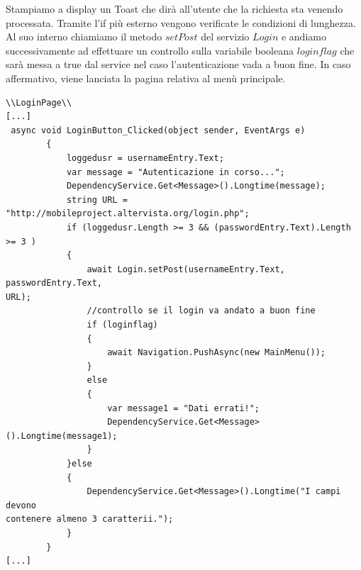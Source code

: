\documentclass[a4paper, 50pt, twoside]{article}
\begin{document}
Stampiamo a display un Toast che dirà all'utente che la richiesta sta venendo processata. Tramite l'if più esterno vengono verificate le condizioni di lunghezza. Al suo interno chiamiamo il metodo $setPost$ del servizio $Login$ e andiamo successivamente ad effettuare un controllo sulla variabile booleana $loginflag$ che sarà messa a true dal service nel caso l'autenticazione vada a buon fine. In caso affermativo, viene lanciata la pagina relativa al menù principale.
\begin{lstlisting}
\\LoginPage\\
[...]
 async void LoginButton_Clicked(object sender, EventArgs e)
        {
            loggedusr = usernameEntry.Text;
            var message = "Autenticazione in corso...";
            DependencyService.Get<Message>().Longtime(message);
            string URL = "http://mobileproject.altervista.org/login.php";
            if (loggedusr.Length >= 3 && (passwordEntry.Text).Length >= 3 )
            {
                await Login.setPost(usernameEntry.Text, passwordEntry.Text, 
URL);
                //controllo se il login va andato a buon fine
                if (loginflag)
                {
                    await Navigation.PushAsync(new MainMenu());
                }
                else
                {
                    var message1 = "Dati errati!";
                    DependencyService.Get<Message>().Longtime(message1);
                }
            }else
            {
                DependencyService.Get<Message>().Longtime("I campi devono 
contenere almeno 3 caratterii.");
            }
        }
[...]
\end{lstlisting}
\end{document}
